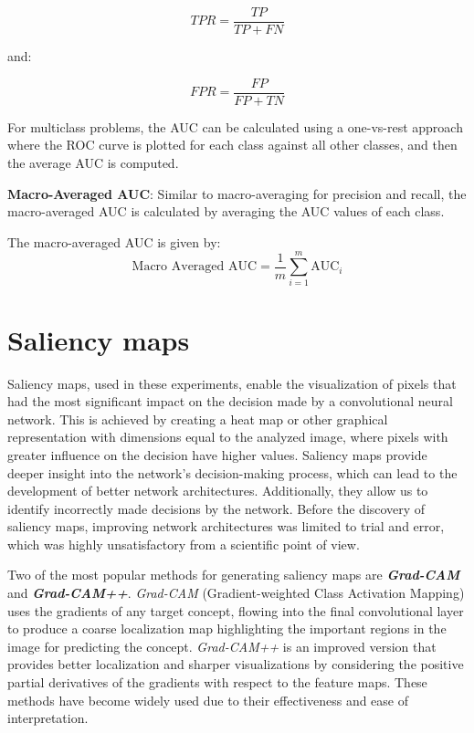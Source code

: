 \begin{equation}
    TPR = \frac{TP}{TP + FN}
\end{equation}

and:

\begin{equation}
    FPR = \frac{FP}{FP + TN}
\end{equation}

For multiclass problems, the AUC can be calculated using a one-vs-rest approach where the ROC curve is plotted for each class against all other classes, and then the average AUC is computed.

\textbf{Macro-Averaged AUC}: Similar to macro-averaging for precision and recall, the macro-averaged AUC is calculated by averaging the AUC values of each class.

The macro-averaged AUC is given by:
\begin{equation}
    \text{Macro Averaged AUC} = \frac{1}{m} \sum_{i=1}^{m} \text{AUC}_i
\end{equation}

\section{Saliency maps}

Saliency maps, used in these experiments, enable the visualization of pixels that had the most significant impact on the decision made by a convolutional neural network. This is achieved by creating a heat map or other graphical representation with dimensions equal to the analyzed image, where pixels with greater influence on the decision have higher values. Saliency maps provide deeper insight into the network's decision-making process, which can lead to the development of better network architectures. Additionally, they allow us to identify incorrectly made decisions by the network. Before the discovery of saliency maps, improving network architectures was limited to trial and error, which was highly unsatisfactory from a scientific point of view.

Two of the most popular methods for generating saliency maps are \textbf{\textit{Grad-CAM}} and \textbf{\textit{Grad-CAM++}}. \textit{Grad-CAM} (Gradient-weighted Class Activation Mapping) uses the gradients of any target concept, flowing into the final convolutional layer to produce a coarse localization map highlighting the important regions in the image for predicting the concept. \textit{Grad-CAM++} is an improved version that provides better localization and sharper visualizations by considering the positive partial derivatives of the gradients with respect to the feature maps. These methods have become widely used due to their effectiveness and ease of interpretation.

